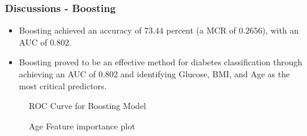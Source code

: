 \documentclass{beamer}
\begin{document}
\begin{frame}
    \frametitle{Discussions - Boosting}
    \begin{itemize}
        \item Boosting achieved an accuracy of $73.44$ percent (a MCR of $0.2656$), with an AUC of $0.802$. 
        \item Boosting proved to be an effective method for diabetes classification through achieving an
        AUC of 0.802 and identifying Glucose, BMI, and Age as the most critical predictors.
    \end{itemize}
    \begin{figure}[h!]
        \centering
        \begin{minipage}{0.48\textwidth}
            \caption{ROC Curve for Boosting Model} 
            \label{fig:ROC curve}
        \end{minipage}
        \hfill %
        \centering
        \begin{minipage}{0.48\textwidth}
            \centering
            \caption{Age Feature importance plot} 
            \label{fig:importance}
        \end{minipage}
    \end{figure}
\end{frame}
   
\end{document}
